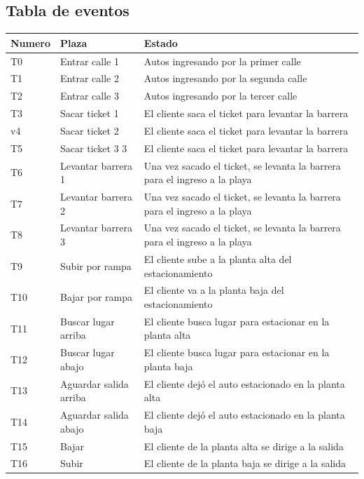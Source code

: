 \documentclass[12pt,a4paper]{article}
\begin{document}
\subsection{Tabla de eventos}
\begin{table}[H]
\centering
\begin{tabular}[width=15cm]{ || C{1.5cm} | L{5cm} | L{8.5cm} || }
\hline
	Numero & Plaza & Estado  \\ \hline
	T0 & Entrar calle 1 & Autos ingresando por la primer calle  \\ \hline
	T1 & Entrar calle 2 & Autos ingresando por la segunda calle \\ \hline
	T2 & Entrar calle 3 & Autos ingresando por la tercer calle \\ \hline
	T3 & Sacar ticket 1 & El cliente saca el ticket para levantar la barrera  \\ \hline
	v4 & Sacar ticket 2 & El cliente saca el ticket para levantar la barrera \\ \hline
	T5 & Sacar ticket 3 3 & El cliente saca el ticket para levantar la barrera \\ \hline
	T6 & Levantar barrera 1 & Una vez sacado el ticket, se levanta la barrera para el ingreso a la playa  \\ \hline
	T7 & Levantar barrera 2 & Una vez sacado el ticket, se levanta la barrera para el ingreso a la playa   \\ \hline
	T8 & Levantar barrera 3 & Una vez sacado el ticket, se levanta la barrera para el ingreso a la playa  \\ \hline
	T9 & Subir por rampa & El cliente sube a la planta alta del estacionamiento   \\ \hline
	T10 & Bajar por rampa & El cliente va a la planta baja del estacionamiento  \\ \hline
	T11 & Buscar lugar arriba & El cliente busca lugar para estacionar en la planta alta  \\ \hline
	T12 & Buscar lugar abajo & El cliente busca lugar para estacionar en la planta baja  \\ \hline
	T13 & Aguardar salida arriba & El cliente dejó el auto estacionado en la planta alta \\ \hline
	T14 & Aguardar salida abajo & El cliente dejó el auto estacionado en la planta baja \\ \hline
	T15 & Bajar & El cliente de la planta alta se dirige a la salida \\ \hline
	T16 & Subir & El cliente de la planta baja se dirige a la salida  \\ \hline

\end{tabular}
\end{table}
\end{document}
